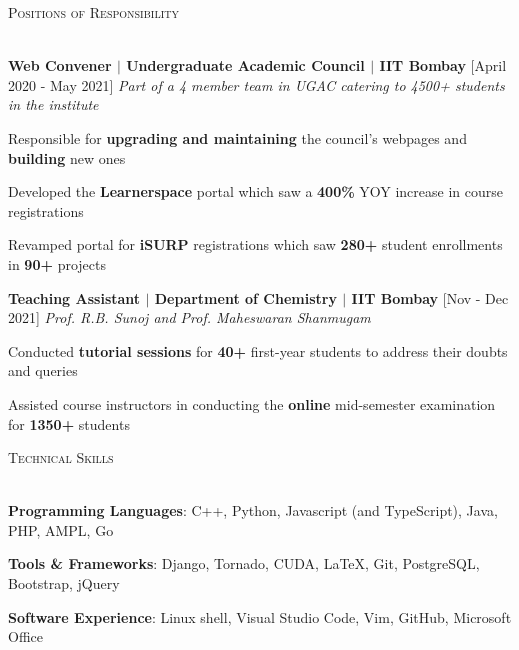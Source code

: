 \documentclass[12pt]{article}
\renewcommand{\section}[1]{
    \vspace*{10pt}
    \textsc{\Large{#1}}
    \vspace*{-10pt} \\ \hspace*{-5pt} 
    \hrulefill \\
    \vspace*{-15pt}
}
\newcommand{\smallbullet}{
    \small$\bullet$
}
\newenvironment{bullet-list-major}{
    \begin{list}{
        \smallbullet
    }{
        \setlength\leftmargin{15pt}\topsep 0pt \itemsep -4pt
    }
} {
    \end{list}
}
\newcommand{\bigblock}[3]{
    {
        \hspace*{-8pt} \textbf{#1} \hfill #2 \newline
        \textit{#3}
    }
}
\newenvironment{bullet-list-minor}{
    \begin{list}{
        \smallbullet
    }{
        \setlength\leftmargin{30pt}\topsep 0pt \itemsep -3pt
    }
} {
    \end{list}
}
\begin{document}

    \section{Positions of Responsibility}

    \bigblock{
        Web Convener \(|\) Undergraduate Academic Council \(|\) IIT Bombay
    }{
        [April 2020 - May 2021]
    }{
        Part of a 4 member team in UGAC catering to 4500+ students in the institute
    }
    \begin{bullet-list-minor}
        \item Responsible for \textbf{upgrading and maintaining} the council's webpages and \textbf{building} new ones
        \item Developed the \textbf{Learnerspace} portal which saw a \textbf{400\%} YOY increase in course registrations
        \item Revamped portal for \textbf{iSURP} registrations which saw \textbf{280+} student enrollments in
        \textbf{90+} projects
    \end{bullet-list-minor}

    \bigblock{
        Teaching Assistant \(|\) Department of Chemistry \(|\) IIT Bombay
    }{
        [Nov - Dec 2021]
    }{
        Prof. R.B. Sunoj and Prof. Maheswaran Shanmugam
    }
    \begin{bullet-list-minor}
        \item Conducted \textbf{tutorial sessions} for \textbf{40+} first-year students to address their
        doubts and queries
        \item Assisted course instructors in conducting the \textbf{online} mid-semester examination for
        \textbf{1350+} students
    \end{bullet-list-minor}
    

    \section{Technical Skills}

    \begin{bullet-list-major}
        \item \textbf{Programming Languages}: C++, Python, Javascript (and TypeScript), Java, PHP, AMPL, Go
        \item \textbf{Tools \& Frameworks}: Django, Tornado, CUDA, LaTeX, Git, PostgreSQL, Bootstrap, jQuery
        \item \textbf{Software Experience}: Linux shell, Visual Studio Code, Vim, GitHub, Microsoft Office
    \end{bullet-list-major} 
\end{document}
